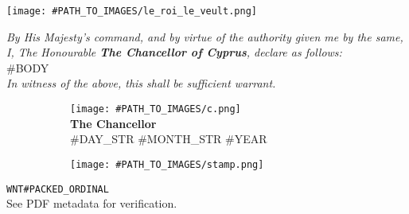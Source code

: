 \documentclass[varwidth=true,border=50pt]{standalone}
\begin{document}
\noindent \texttt{[image: \#PATH\_TO\_IMAGES/le\_roi\_le\_veult.png]}

\vspace{10pt}

\textit{By His Majesty's command, and by virtue of the authority given me by the same, I, The Honourable \textbf{The Chancellor of Cyprus}, declare as follows:}\\

#BODY\\

\textit{In witness of the above, this shall be sufficient warrant.}

\vspace{20pt}

\begin{figure}
\centering
\begin{subfigure}{.5\textwidth}
    \centering
    \texttt{[image: \#PATH\_TO\_IMAGES/c.png]}\\
    \vspace{5pt}
    \textbf{The Chancellor}\\
    #DAY_STR #MONTH_STR #YEAR
\end{subfigure}%
\begin{subfigure}{.5\textwidth}
    \centering
    \texttt{[image: \#PATH\_TO\_IMAGES/stamp.png]}
\end{subfigure}%
\end{figure}

\vspace{30pt}

\hfill {\footnotesize \texttt{WNT#PACKED_ORDINAL}}\\

{\tiny See PDF metadata for verification.}
\end{document}
